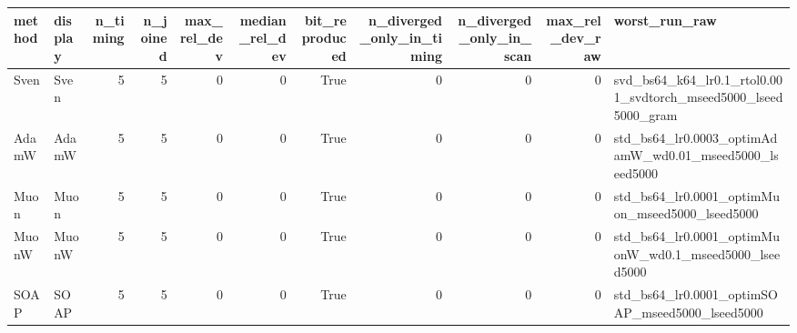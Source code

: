 \begin{tabular}{llrrrrrrrrl}
\toprule
method & display & n\_timing & n\_joined & max\_rel\_dev & median\_rel\_dev & bit\_reproduced & n\_diverged\_only\_in\_timing & n\_diverged\_only\_in\_scan & max\_rel\_dev\_raw & worst\_run\_raw \\
\midrule
Sven & Sven & 5 & 5 & 0 & 0 & True & 0 & 0 & 0 & svd\_bs64\_k64\_lr0.1\_rtol0.001\_svdtorch\_mseed5000\_lseed5000\_gram \\
AdamW & AdamW & 5 & 5 & 0 & 0 & True & 0 & 0 & 0 & std\_bs64\_lr0.0003\_optimAdamW\_wd0.01\_mseed5000\_lseed5000 \\
Muon & Muon & 5 & 5 & 0 & 0 & True & 0 & 0 & 0 & std\_bs64\_lr0.0001\_optimMuon\_mseed5000\_lseed5000 \\
MuonW & MuonW & 5 & 5 & 0 & 0 & True & 0 & 0 & 0 & std\_bs64\_lr0.0001\_optimMuonW\_wd0.1\_mseed5000\_lseed5000 \\
SOAP & SOAP & 5 & 5 & 0 & 0 & True & 0 & 0 & 0 & std\_bs64\_lr0.0001\_optimSOAP\_mseed5000\_lseed5000 \\
\bottomrule
\end{tabular}
